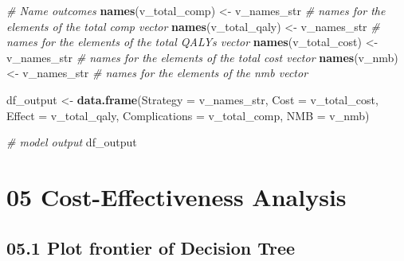 \documentclass[
]{article}
\newenvironment{Shaded}{\begin{snugshade}}{\end{snugshade}}
\newcommand{\AttributeTok}[1]{\textcolor[rgb]{0.13,0.29,0.53}{#1}}
\newcommand{\CommentTok}[1]{\textcolor[rgb]{0.56,0.35,0.01}{\textit{#1}}}
\newcommand{\FunctionTok}[1]{\textcolor[rgb]{0.13,0.29,0.53}{\textbf{#1}}}
\newcommand{\NormalTok}[1]{#1}
\newcommand{\OtherTok}[1]{\textcolor[rgb]{0.56,0.35,0.01}{#1}}
\newcommand{\SpecialCharTok}[1]{\textcolor[rgb]{0.81,0.36,0.00}{\textbf{#1}}}
\begin{document}
\begin{Shaded}
\begin{Highlighting}[]
\CommentTok{\# Name outcomes}
\FunctionTok{names}\NormalTok{(v\_total\_comp) }\OtherTok{\textless{}{-}}\NormalTok{ v\_names\_str  }\CommentTok{\# names for the elements of the total comp vector}
\FunctionTok{names}\NormalTok{(v\_total\_qaly) }\OtherTok{\textless{}{-}}\NormalTok{ v\_names\_str  }\CommentTok{\# names for the elements of the total QALYs vector}
\FunctionTok{names}\NormalTok{(v\_total\_cost) }\OtherTok{\textless{}{-}}\NormalTok{ v\_names\_str  }\CommentTok{\# names for the elements of the total cost vector}
\FunctionTok{names}\NormalTok{(v\_nmb)        }\OtherTok{\textless{}{-}}\NormalTok{ v\_names\_str  }\CommentTok{\# names for the elements of the nmb vector}
  
\NormalTok{df\_output }\OtherTok{\textless{}{-}} \FunctionTok{data.frame}\NormalTok{(}\AttributeTok{Strategy =}\NormalTok{  v\_names\_str,}
                        \AttributeTok{Cost     =}\NormalTok{  v\_total\_cost,}
                        \AttributeTok{Effect   =}\NormalTok{  v\_total\_qaly,}
                        \AttributeTok{Complications =}\NormalTok{ v\_total\_comp,}
                        \AttributeTok{NMB      =}\NormalTok{  v\_nmb)}

\CommentTok{\# model output}
\NormalTok{df\_output}
\end{Highlighting}
\end{Shaded}

\hypertarget{cost-effectiveness-analysis}{%
\section{05 Cost-Effectiveness
Analysis}\label{cost-effectiveness-analysis}}

\begin{Shaded}
\end{Shaded}

\hypertarget{plot-frontier-of-decision-tree}{%
\subsection{05.1 Plot frontier of Decision
Tree}\label{plot-frontier-of-decision-tree}}
\end{document}
